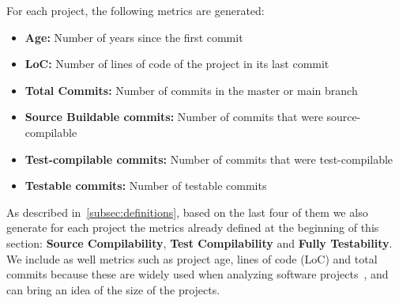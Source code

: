 
For each project, the following metrics are generated:

\begin{itemize}
    \item \textbf{Age:} Number of years since the first commit
    \item \textbf{LoC:} Number of lines of code of the project in its last commit
    \item \textbf{Total Commits:} Number of commits in the master or main branch
    \item \textbf{Source Buildable commits:} Number of commits that were source-compilable
    \item \textbf{Test-compilable commits:} Number of commits that were test-compilable
    \item \textbf{Testable commits:} Number of testable commits
\end{itemize}


As described in~\ref{subsec:definitions}, based on the last four of them we also generate for each project the metrics already defined at the beginning of this section: \textbf{Source Compilability}, \textbf{Test Compilability} and \textbf{Fully Testability}.
We include as well metrics such as project age, lines of code (LoC) and total commits because these are widely used when analyzing software projects~\cite{yamashita2015revisiting,mannan2016understanding,rosen2015commit}, and can bring an idea of the size of the projects. 

